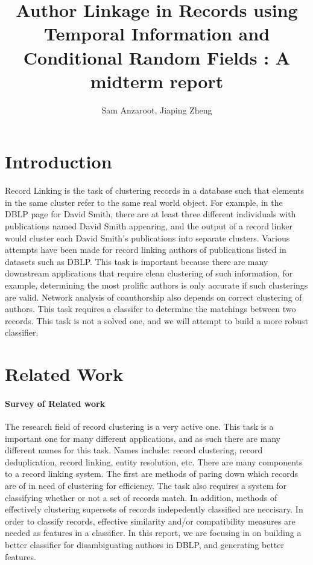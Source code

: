 \documentclass[twocolumn]{article}
\title{Author Linkage in Records using Temporal Information and Conditional Random Fields : A midterm report}
\author{Sam Anzaroot, Jiaping Zheng}
\date{}
\begin{document}
\ifpdf
{}
\else
{}
\fi

\maketitle

\section{Introduction} %
\label{sec:introduction}
Record Linking is the task of clustering records in a database such that elements in the same cluster refer to the same real world object. For example, in the DBLP page for David Smith, there are at least three different individuals with publications named David Smith appearing, and the output of a record linker would cluster each David Smith's publications into separate clusters. Various attempts have been made for record linking authors of publications listed in datasets such as DBLP. This task is important because there are many downstream applications that require clean clustering of such information, for example, determining the most prolific authors is only accurate if such clusterings are valid. Network analysis of coauthorship also depends on correct clustering of authors. This task requires a classifer to determine the matchings between two records. This task is not a solved one, and we will attempt to build a more robust classifier.

\section{Related Work} %
\label{sec:related_work}
\paragraph{Survey of Related work} %
\label{par:survey_of_related_work}
The research field of record clustering is a very active one. This task is a important one for many different applications, and as such there are many different names for this task. Names include: record clustering, record deduplication, record linking, entity resolution, etc. There are many components to a record linking system. The first are methods of paring down which records are of in need of clustering for efficiency. The task also requires a system for classifying whether or not a set of records match. In addition, methods of effectively clustering supersets of records indepedently classified are neccisary. In order to classify records, effective similarity and/or compatibility measures are needed as features in a classifier. In this report, we are focusing in on building a better classifier for disambiguating authors in DBLP, and generating better features. 
\end{document}
